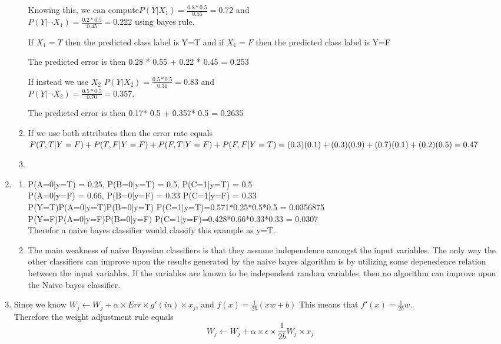 \documentclass[11pt,fleqn]{article}
\begin{document}
\begin{enumerate}
\begin{enumerate}
Knowing this, we can compute$ P(Y|X_{1})=\frac{0.8*0.5}{0.55}= 0.72$  and \\
$ P(Y|\lnot X_{1})=\frac{0.2*0.5}{0.45}= 0.222$ using bayes rule. 

If $X_{1}=T$ then the predicted class label is Y=T and if $X_{1}=F$ then the predicted class label is Y=F

The predicted error is then 0.28 * 0.55 + 0.22 * 0.45 = 0.253

If instead we use $X_{2}$
$ P(Y|X_{2})=\frac{0.5*0.5}{0.30}= 0.83$  and \\
$ P(Y|\lnot X_{2})=\frac{0.5*0.5}{0.70}= 0.357$.

The predicted error is then 0.17* 0.5 + 0.357* 0.5 =  0.2635
\item %
If we use both attributes then the error rate equals \\
$P(T,T | Y=F) + P(T,F|Y=F) + P(F,T|Y=F) + P(F,F|Y=T) = \\
(0.3)(0.1)+(0.3)(0.9)+(0.7)(0.1)+(0.2)(0.5) = 0.47$
\item %

\end{enumerate}


\item %
\begin{enumerate}
\item 
P(A=0|y=T) = 0.25, P(B=0|y=T) = 0.5, P(C=1|y=T) = 0.5 \\
P(A=0|y=F) = 0.66, P(B=0|y=F) = 0.33 P(C=1|y=F) = 0.33 \\
P(Y=T)P(A=0|y=T)P(B=0|y=T) P(C=1|y=T)=0.571*0.25*0.5*0.5 = 0.0356875 \\
P(Y=F)P(A=0|y=F)P(B=0|y=F) P(C=1|y=F)=0.428*0.66*0.33*0.33 = 0.0307 \\

Therefor a naive bayes classifier would classify this example as y=T. 
\item 
The main weakness of naive Bayesian classifiers is that they assume independence amongst the input variables. The only way the other classifiers can improve upon the results generated by the naive bayes algorithm is by utilizing some depenedence relation between the input variables. If the variables are known to be independent random variables, then no algorithm can improve upon the Naive bayes classifier. 

\end{enumerate}
\item %
Since we know $W_{j} \leftarrow W_{j} + \alpha \times Err \times g'(in) \times x_{j}$, and $f(x) = \frac{1}{2b}(xw+b)$ This means that $f'(x) = \frac{1}{2b}w$. \\
Therefore the weight adjustment rule equals
\[W_{j} \leftarrow W_{j} + \alpha \times \epsilon \times \frac{1}{2b}W_{j}\times x_{j}\]
\end{enumerate}
\end{document}
